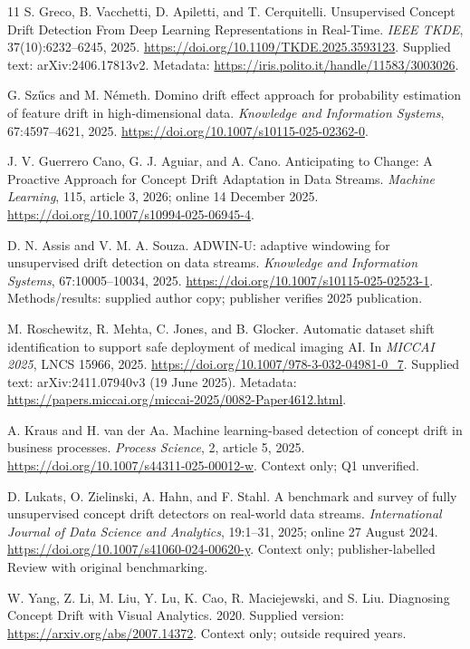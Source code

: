\documentclass[10pt,a4paper]{article}
\begin{document}
\clearpage
\begin{thebibliography}{11}\small
{}
S. Greco, B. Vacchetti, D. Apiletti, and T. Cerquitelli.
Unsupervised Concept Drift Detection From Deep Learning Representations in Real-Time.
\emph{IEEE TKDE}, 37(10):6232--6245, 2025.
\url{https://doi.org/10.1109/TKDE.2025.3593123}.
Supplied text: arXiv:2406.17813v2.
Metadata: \url{https://iris.polito.it/handle/11583/3003026}.

G. Sz\H{u}cs and M. N\'emeth.
Domino drift effect approach for probability estimation of feature drift in high-dimensional data.
\emph{Knowledge and Information Systems}, 67:4597--4621, 2025.
\url{https://doi.org/10.1007/s10115-025-02362-0}.

J. V. Guerrero Cano, G. J. Aguiar, and A. Cano.
Anticipating to Change: A Proactive Approach for Concept Drift Adaptation in Data Streams.
\emph{Machine Learning}, 115, article 3, 2026; online 14 December 2025.
\url{https://doi.org/10.1007/s10994-025-06945-4}.

D. N. Assis and V. M. A. Souza.
ADWIN-U: adaptive windowing for unsupervised drift detection on data streams.
\emph{Knowledge and Information Systems}, 67:10005--10034, 2025.
\url{https://doi.org/10.1007/s10115-025-02523-1}.
Methods/results: supplied author copy; publisher verifies 2025 publication.

M. Roschewitz, R. Mehta, C. Jones, and B. Glocker.
Automatic dataset shift identification to support safe deployment of medical imaging AI.
In \emph{MICCAI 2025}, LNCS 15966, 2025.
\url{https://doi.org/10.1007/978-3-032-04981-0_7}.
Supplied text: arXiv:2411.07940v3 (19 June 2025).
Metadata: \url{https://papers.miccai.org/miccai-2025/0082-Paper4612.html}.

A. Kraus and H. van der Aa.
Machine learning-based detection of concept drift in business processes.
\emph{Process Science}, 2, article 5, 2025.
\url{https://doi.org/10.1007/s44311-025-00012-w}.
Context only; Q1 unverified.

D. Lukats, O. Zielinski, A. Hahn, and F. Stahl.
A benchmark and survey of fully unsupervised concept drift detectors on real-world data streams.
\emph{International Journal of Data Science and Analytics}, 19:1--31, 2025; online 27 August 2024.
\url{https://doi.org/10.1007/s41060-024-00620-y}.
Context only; publisher-labelled Review with original benchmarking.

W. Yang, Z. Li, M. Liu, Y. Lu, K. Cao, R. Maciejewski, and S. Liu.
Diagnosing Concept Drift with Visual Analytics. 2020.
Supplied version: \url{https://arxiv.org/abs/2007.14372}.
Context only; outside required years.


\end{thebibliography}
\end{document}
